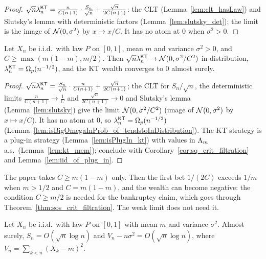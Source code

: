 \begin{proof}
  \leanok
  $\sqrt n \lambda^{\mathsf{KT}}_n = \frac{n}{C(n+1)} \cdot \frac{S_n}{\sqrt n} + \frac{\sqrt n}{2C(n+1)}$: the CLT
  (Lemma~\ref{lem:clt_hasLaw}) and Slutsky's lemma with deterministic factors
  (Lemma~\ref{lem:slutsky_det}); the limit is the image of $\mathcal{N}(0, \sigma^2)$ by
  $x \mapsto x/C$. It has no atom at $0$ when $\sigma^2 > 0$.
\end{proof}

\begin{proposition}
  \label{prop:kt}
  \leanok
  Let $X_n$ be i.i.d.\ with law $P$ on $[0,1]$, mean $m$ and variance $\sigma^2 > 0$, and
  $C \ge \max(m(1-m), m/2)$. Then $\sqrt n \lambda^{\mathsf{KT}}_n \to \mathcal{N}(0, \sigma^2/C^2)$ in distribution,
  $\lambda^{\mathsf{KT}}_n = \Omega_p(n^{-1/2})$, and the KT wealth converges to $0$ almost surely.
\end{proposition}

\begin{proof}
  \leanok
  $\sqrt n \lambda^{\mathsf{KT}}_n = \frac{S_n}{\sqrt n} \cdot \frac{n}{C(n+1)} + \frac{\sqrt n}{2C(n+1)}$; the CLT
  for $S_n/\sqrt n$, the deterministic limits $\frac{n}{C(n+1)} \to \frac1C$ and
  $\frac{\sqrt n}{2C(n+1)} \to 0$ and Slutsky's lemma (Lemma~\ref{lem:slutsky}) give the limit
  $\mathcal{N}(0,\sigma^2/C^2)$ (image of $\mathcal{N}(0, \sigma^2)$ by $x \mapsto x/C$). It has no atom
  at $0$, so $\lambda^{\mathsf{KT}}_n = \Omega_p(n^{-1/2})$
  (Lemma~\ref{lem:isBigOmegaInProb_of_tendstoInDistribution}). The KT strategy is a plug-in strategy
  (Lemma~\ref{lem:isPlugIn_kt}) with values in $\Lambda_m$ a.s.\ (Lemma~\ref{lem:kt_mem}); conclude with
  Corollary~\ref{cor:sq_crit_filtration} and Lemma~\ref{lem:iid_of_plug_in}.
\end{proof}

\begin{remark}
  The paper takes $C \ge m(1-m)$ only. Then the first bet $1/(2C)$ exceeds $1/m$ when $m > 1/2$
  and $C = m(1-m)$, and the wealth can become negative: the condition $C \ge m/2$ is needed for the
  bankruptcy claim, which goes through Theorem~\ref{thm:sos_crit_filtration}. The weak limit does
  not need it.
\end{remark}

\begin{lemma}
  \label{lem:good_event}
  \leanok
  Let $X_n$ be i.i.d.\ with law $P$ on $[0,1]$ with mean $m$ and variance $\sigma^2$. Almost surely,
  $S_n = O(\sqrt n \log n)$ and $V_n - n\sigma^2 = O(\sqrt n \log n)$, where
  $V_n = \sum_{k<n} (X_k - m)^2$.
\end{lemma}

